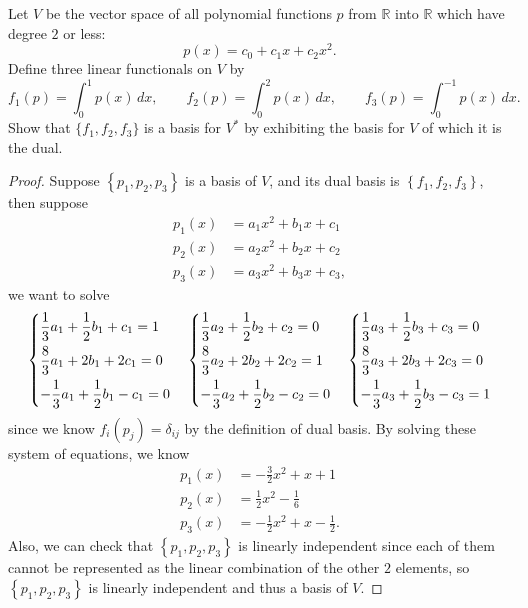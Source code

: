 \begin{problem}
Let $V$ be the vector space of all polynomial functions $p$ from $\mathbb{R}$ into $\mathbb{R}$ which have degree $2$ or less:
\[
p(x)=c_0 + c_1 x + c_2 x^2.
\]
Define three linear functionals on $V$ by
\[
f_1(p)=\int_0^1 p(x)\,dx,\qquad
f_2(p)=\int_0^2 p(x)\,dx,\qquad
f_3(p)=\int_{0}^{-1} p(x)\,dx.
\]
Show that $\{f_1,f_2,f_3\}$ is a basis for $V^*$ by exhibiting the basis for $V$ of which it is the dual.
\end{problem}
\begin{proof}
    Suppose \(\left\{ p_1, p_2, p_3 \right\} \) is a basis of \(V\), and its dual basis is \(\left\{ f_1, f_2, f_3 \right\} \), then suppose 
    \begin{align*}
        p_1(x) &= a_1 x^2 + b_1 x + c_1 \\
        p_2(x) &= a_2 x^2 + b_2 x + c_2 \\
        p_3(x) &= a_3 x^2 + b_3 x + c_3,
    \end{align*} 
    we want to solve 
    \[
        \begin{dcases}
            \frac{1}{3} a_1 + \frac{1}{2} b_1 + c_1 = 1 \\
            \frac{8}{3} a_1 + 2 b_1 + 2 c_1 = 0 \\
            -\frac{1}{3}a_1 + \frac{1}{2} b_1 - c_1 = 0
        \end{dcases} \quad 
        \begin{dcases}
            \frac{1}{3} a_2 + \frac{1}{2} b_2 + c_2 = 0 \\
            \frac{8}{3} a_2 + 2 b_2 + 2 c_2 = 1 \\
            -\frac{1}{3}a_2 + \frac{1}{2} b_2 - c_2 = 0
        \end{dcases} \quad 
        \begin{dcases}
            \frac{1}{3} a_3 + \frac{1}{2} b_3 + c_3 = 0 \\
            \frac{8}{3} a_3 + 2 b_3 + 2 c_3 = 0 \\
            -\frac{1}{3}a_3 + \frac{1}{2} b_3 - c_3 = 1
        \end{dcases}
    \] since we know \(f_i \left( p_j \right) = \delta _{ij}\) by the definition of dual basis. By solving these system of equations, we know 
    \begin{align*}
        p_1(x) &= -\frac{3}{2}x^2 + x + 1 \\
        p_2(x) &= \frac{1}{2}x^2 - \frac{1}{6} \\
        p_3(x) &= -\frac{1}{2}x^2 + x - \frac{1}{2}.
    \end{align*} 
    Also, we can check that \(\left\{ p_1, p_2, p_3 \right\} \) is linearly independent since each of them cannot be represented as the linear combination of the other \(2\) elements, so \(\left\{ p_1, p_2, p_3 \right\} \) is linearly independent and thus a basis of \(V\). 
\end{proof}